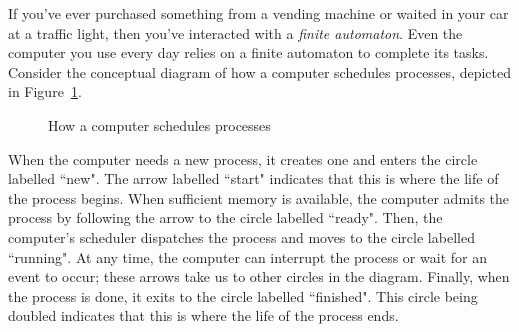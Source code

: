 If you've ever purchased something from a vending machine or waited in your car at a traffic light, then you've interacted with a \emph{finite automaton}. Even the computer you use every day relies on a finite automaton to complete its tasks. Consider the conceptual diagram of how a computer schedules processes, depicted in Figure~\ref{fig:processscheduler}.
\begin{figure}[b]
\centering
{}
\caption{How a computer schedules processes}
\label{fig:processscheduler}
\end{figure}
When the computer needs a new process, it creates one and enters the circle labelled ``new". The arrow labelled ``start" indicates that this is where the life of the process begins. When sufficient memory is available, the computer admits the process by following the arrow to the circle labelled ``ready". Then, the computer's scheduler dispatches the process and moves to the circle labelled ``running". At any time, the computer can interrupt the process or wait for an event to occur; these arrows take us to other circles in the diagram. Finally, when the process is done, it exits to the circle labelled ``finished". This circle being doubled indicates that this is where the life of the process ends.

